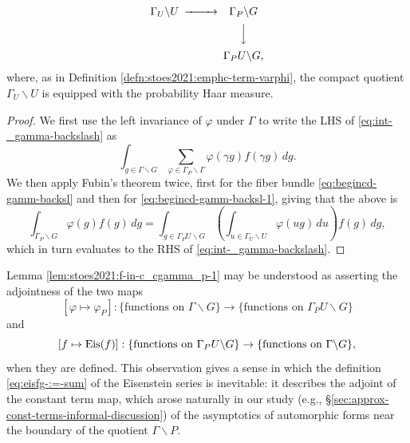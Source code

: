 \documentclass[reqno]{amsart} 
\begin{document}
\begin{lemma}
\begin{itemize}
    \begin{equation}\label{eq:begincd-gamm-backsl-1}
      \begin{CD}         
        \Gamma_U \backslash U  @>>>  \Gamma_P \backslash G \\
        @.  @VVV \\
        @. \Gamma_P U \backslash G, \\
      \end{CD}
    \end{equation}
    where, as in Definition \ref{defn:stoes2021:emphc-term-varphi}, the compact quotient $\Gamma_U \backslash U$ is equipped with the probability Haar measure.
  \end{itemize}
\end{lemma}
\begin{proof}
  We first use the left invariance of $\varphi$ under $\Gamma$ to write the LHS of \eqref{eq:int-_gamma-backslash} as
  \begin{equation*}
    \int _{g \in \Gamma \backslash G} \sum _{\varphi \in \Gamma_P \backslash \Gamma } \varphi(\gamma g) f(\gamma g) \, d g.
  \end{equation*}
  We then apply Fubin's theorem twice, first for the fiber bundle \eqref{eq:begincd-gamm-backsl} and then for \eqref{eq:begincd-gamm-backsl-1}, giving that the above is
  \begin{equation*}
    \int _{\Gamma_P \backslash G} \varphi(g) f(g) \,d g 
    = \int _{g \in \Gamma_P U \backslash G} \left( \int _{u \in \Gamma_U \backslash U} \varphi (u g) \,d u \right) f(g) \, d g,
  \end{equation*}
  which in turn evaluates to the RHS of \eqref{eq:int-_gamma-backslash}.
\end{proof}

Lemma \ref{lem:stoes2021:f-in-c_cgamma_p-1} may be understood as asserting the adjointness of the two maps
\begin{equation*}
  {}  [\varphi \mapsto \varphi_P] : \{\text{functions on } \Gamma \backslash G\} \rightarrow \{\text{functions on } \Gamma_P U \backslash G\}
\end{equation*}
and
\begin{equation*}
  {} [f \mapsto \operatorname{Eis}(f)] :\{\text{functions on } \Gamma_P U \backslash G\}  \rightarrow \{\text{functions on } \Gamma \backslash G\},
\end{equation*}
when they are defined.  This observation gives a sense in which the definition \eqref{eq:eisfg-:=-sum} of the Eisenstein series is inevitable: it describes the adjoint of the constant term map, which arose naturally in our study (e.g., \S\ref{sec:approx-const-terms-informal-discussion}) of the asymptotics of automorphic forms near the boundary of the quotient $\Gamma \backslash P$.
\end{document}
